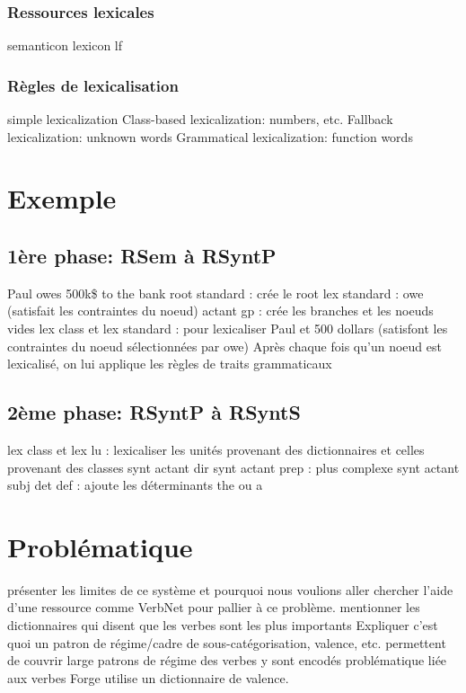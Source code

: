 \subsubsection{Ressources lexicales}
semanticon
lexicon
lf

\subsubsection{Règles de lexicalisation}
simple lexicalization
Class-based lexicalization: numbers, etc.
Fallback lexicalization: unknown words
Grammatical lexicalization: function words



\section{Exemple}
\subsection{1ère phase: RSem à RSyntP}
Paul owes 500k\$ to the bank
root standard : crée le root
lex standard : owe (satisfait les contraintes du noeud)
actant gp : crée les branches et les noeuds vides
lex class et lex standard : pour lexicaliser Paul et 500 dollars (satisfont les contraintes du noeud sélectionnées par owe)
Après chaque fois qu'un noeud est lexicalisé, on lui applique les règles de traits grammaticaux

\subsection{2ème phase: RSyntP à RSyntS}
lex class et lex lu : lexicaliser les unités provenant des dictionnaires et celles provenant des classes
synt actant dir
synt actant prep : plus complexe
synt actant subj
det def : ajoute les déterminants the ou a

\section{Problématique}
présenter les limites de ce système et pourquoi nous voulions aller chercher l'aide d'une ressource comme VerbNet pour pallier à ce problème.
mentionner les dictionnaires qui disent que les verbes sont les plus importants
Expliquer c'est quoi un patron de régime/cadre de sous-catégorisation, valence, etc.
permettent de couvrir large
patrons de régime des verbes y sont encodés
problématique liée aux verbes
Forge utilise un dictionnaire de valence.